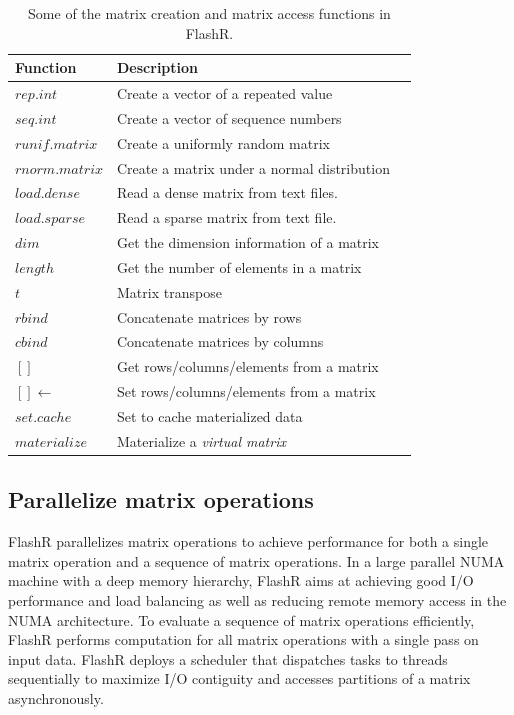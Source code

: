 \begin{table}
\begin{center}
\caption{Some of the matrix creation and matrix access functions in FlashR.}
\vspace{-10pt}
\footnotesize
\begin{tabular}{|l|l|l|}
\hline
Function & Description \\
\hline
$rep.int$ & Create a vector of a repeated value \\
$seq.int$ & Create a vector of sequence numbers \\
$runif.matrix$ & Create a uniformly random matrix  \\
$rnorm.matrix$ & Create a matrix under a normal distribution \\
\hline
$load.dense$ & Read a dense matrix from text files. \\
$load.sparse$ & Read a sparse matrix from text file. \\
\hline
$dim$ & Get the dimension information of a matrix\\
$length$ & Get the number of elements in a matrix\\
\hline
$t$ & Matrix transpose \\
$rbind$ & Concatenate matrices by rows \\
$cbind$ & Concatenate matrices by columns \\
$[]$ & Get rows/columns/elements from a matrix \\
$[]\gets$ & Set rows/columns/elements from a matrix \\
\hline
$set.cache$ & Set to cache materialized data \\
$materialize$ & Materialize a \textit{virtual matrix} \\
\hline
\end{tabular}
\normalsize
\label{tbl:utility}
\end{center}
\end{table}

\subsection{Parallelize matrix operations}

FlashR parallelizes matrix operations to achieve performance for both
a single matrix operation and a sequence of matrix operations. In a large
parallel NUMA machine with a deep memory hierarchy, FlashR aims at achieving good
I/O performance and load balancing as well as reducing remote memory access
in the NUMA architecture. To evaluate a sequence of matrix operations
efficiently, FlashR performs computation for all matrix operations with
a single pass on input data. FlashR deploys a scheduler that dispatches
tasks to threads sequentially to maximize I/O contiguity and accesses
partitions of a matrix asynchronously.

